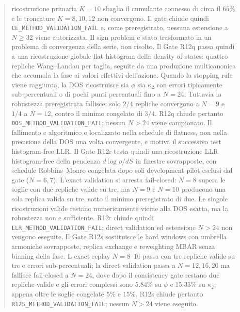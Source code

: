 \documentclass[11pt,a4paper]{article}
\begin{document}
\begin{abstract}
ricostruzione primaria $K=10$ sbaglia il cumulante connesso di circa il $65\%$ e le troncature $K=8,10,12$ non convergono. Il gate chiude quindi \texttt{CE\_METHOD\_VALIDATION\_FAIL} e, come preregistrato, nessuna estensione a $N\ge32$ viene autorizzata. Il sign problem e stato trasformato in un problema di convergenza della serie, non risolto.
Il Gate R12q passa quindi a una ricostruzione globale flat-histogram della density of states: quattro repliche Wang--Landau per taglia, seguite da una produzione multicanonica che accumula la fase ai valori effettivi dell'azione. Quando la stopping rule viene raggiunta, la DOS ricostruisce sia $\phi$ sia $\kappa_2$ con errori tipicamente sub-percentuali o di pochi punti percentuali fino a $N=24$. Tuttavia la robustezza preregistrata fallisce: solo $2/4$ repliche convergono a $N=9$ e $1/4$ a $N=12$, contro il minimo congelato di $3/4$. R12q chiude pertanto \texttt{DOS\_METHOD\_VALIDATION\_FAIL}; nessun $N>24$ viene campionato. Il fallimento e algoritmico e localizzato nella schedule di flatness, non nella precisione della DOS una volta convergente, e motiva il successivo test histogram-free LLR. Il Gate R12r testa quindi una ricostruzione LLR histogram-free della pendenza $d\log\rho/dS$ in finestre sovrapposte, con schedule Robbins--Monro congelata dopo soli development pilot esclusi dal gate ($N=6,7$). L'exact validation si arresta fail-closed: $N=8$ supera le soglie con due repliche valide su tre, ma $N=9$ e $N=10$ producono una sola replica valida su tre, sotto il minimo preregistrato di due. Le singole ricostruzioni valide restano numericamente vicine alla DOS esatta, ma la robustezza non e sufficiente. R12r chiude quindi \texttt{LLR\_METHOD\_VALIDATION\_FAIL}; direct validation ed estensione $N>24$ non vengono eseguite. Il Gate R12s sostituisce le hard windows con umbrella armoniche sovrapposte, replica exchange e reweighting MBAR senza binning della fase. L exact replay $N=8$--$10$ passa con tre repliche valide su tre e errori sub-percentuali; la direct validation passa a $N=12,16,20$ ma fallisce fail-closed a $N=24$, dove dopo il consistency gate restano due repliche valide e gli errori complessi sono $5.84\%$ su $\phi$ e $15.33\%$ su $\kappa_2$, appena oltre le soglie congelate $5\%$ e $15\%$. R12s chiude pertanto \texttt{R12S\_METHOD\_VALIDATION\_FAIL}; nessun $N>24$ viene eseguito.

\end{abstract}
\end{document}
